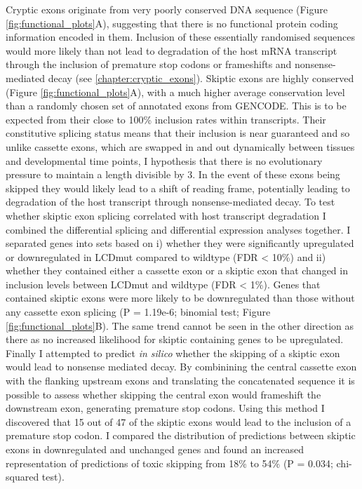 Cryptic exons originate from very poorly conserved DNA sequence  (Figure \ref{fig:functional_plots}A), suggesting that there is no functional protein coding information encoded in them. 
Inclusion of these essentially randomised sequences would more likely than not lead to degradation of the host mRNA transcript through the inclusion of premature stop codons or frameshifts and nonsense-mediated decay (see \autoref{chapter:cryptic_exons}). 
Skiptic exons are highly conserved (Figure \ref{fig:functional_plots}A), with a much higher average conservation level than a randomly chosen set of annotated exons from GENCODE.  
This is to be expected from their close to 100\% inclusion rates within transcripts. 
Their constitutive splicing status means that their inclusion is near guaranteed and so unlike cassette exons, which are swapped in and out dynamically between tissues and developmental time points, I hypothesis that there is no evolutionary pressure to maintain a length divisible by 3. 
In the event of these exons being skipped they would likely lead to a shift of reading frame, potentially leading to degradation of the host transcript through nonsense-mediated decay.
 To test whether skiptic exon splicing correlated with host transcript degradation I combined the differential splicing and differential expression analyses together. I separated genes into sets based on i) whether they were significantly upregulated or downregulated in LCDmut compared to wildtype (FDR < 10\%) and ii) whether they contained either a cassette exon or a skiptic exon that changed in inclusion levels between LCDmut and wildtype (FDR < 1\%). 
 Genes that contained skiptic exons were more likely to be downregulated than those without any cassette exon splicing  (P = 1.19e-6; binomial test; Figure \ref{fig:functional_plots}B). The same trend cannot be seen in the other direction as there as no increased likelihood for skiptic containing genes to be upregulated. 
 Finally I attempted to predict \textit{in silico} whether the skipping of a skiptic exon would lead to nonsense mediated decay. 
 By combinining the central cassette exon with the flanking upstream exons and translating the concatenated sequence it is possible to assess whether skipping the central exon would frameshift the downstream exon, generating premature stop codons. 
 Using this method I discovered that 15 out of 47 of the skiptic exons would lead to the inclusion of a premature stop codon.  
I compared the distribution of predictions between skiptic exons in downregulated and unchanged genes and found an increased representation of predictions of toxic skipping from 18\% to 54\% (P = 0.034; chi-squared test). 

